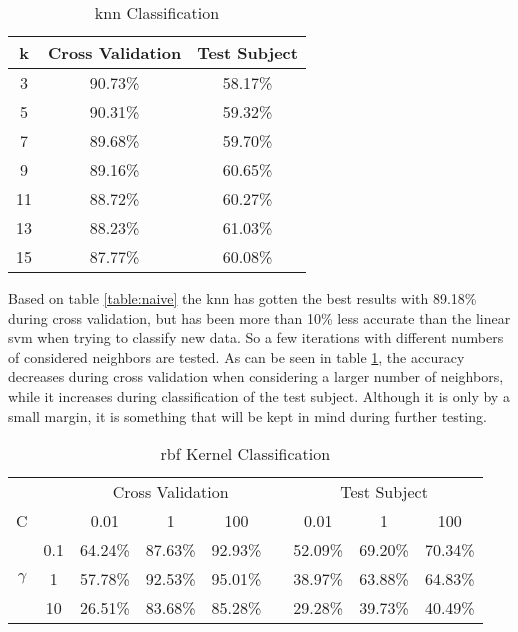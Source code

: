 \begin{table}[!htb]
    \centering
    \begin{tabular}{@{}ccc@{}}
        \toprule
        k & Cross Validation & Test Subject \\
        \midrule
        3 & 90.73\% & 58.17\% \\
        5 & 90.31\% & 59.32\% \\
        7 & 89.68\% & 59.70\% \\
        9 & 89.16\% & 60.65\% \\
        11 & 88.72\% & 60.27\% \\
        13 & 88.23\% & 61.03\% \\
        15 & 87.77\% & 60.08\% \\
        \bottomrule
    \end{tabular}
    \caption{\gls{knn} Classification}
    \label{table:knn}
\end{table}

Based on table \ref{table:naive} the \gls{knn} has gotten the best results with 89.18\% during cross validation, but has been more than 10\% less accurate than the linear \gls{svm} when trying to classify new data. So a few iterations with different numbers of considered neighbors are tested. As can be seen in table \ref{table:knn}, the accuracy decreases during cross validation when considering a larger number of neighbors, while it increases during classification of the test subject. Although it is only by a small margin, it is something that will be kept in mind during further testing.

\begin{table}[!htb]
    \centering
    \begin{tabular}{@{}lcccccccc@{}}
        \toprule
         & & \multicolumn{3}{c}{Cross Validation} & & \multicolumn{3}{c}{Test Subject} \\
        \cmidrule(lr){3-5} \cmidrule(l){7-9}
        \multicolumn{1}{l}{C} & & 0.01 & 1 & 100 & & 0.01 & 1 & 100 \\
        \midrule
        \multicolumn{1}{c}{\multirow{3}{*}{$\gamma$}} & 0.1 & 64.24\% & 87.63\% & 92.93\% & & 52.09\% & 69.20\% & 70.34\% \\
        \multicolumn{1}{c}{} & 1 & 57.78\% & 92.53\% & 95.01\% & & 38.97\% & 63.88\% & 64.83\% \\
        \multicolumn{1}{c}{} & 10  & 26.51\% & 83.68\% & 85.28\% & & 29.28\% & 39.73\% & 40.49\% \\
        \bottomrule
    \end{tabular}
    \caption{\gls{rbf} Kernel Classification}
    \label{table:rbf}
\end{table}


